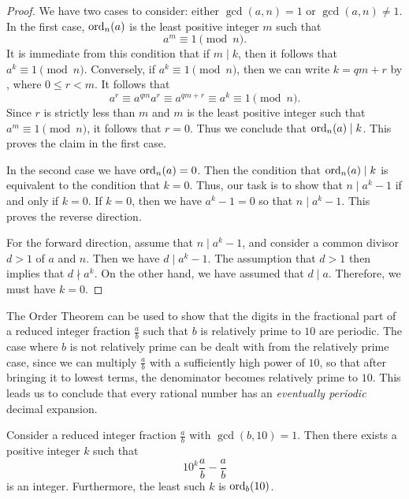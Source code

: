 \begin{proof}
  We have two cases to consider: either $\gcd(a,n)=1$ or $\gcd(a,n)\neq 1$. In the first case, $\operatorname{ord}_n(a)$ is the least positive integer $m$ such that
  \begin{equation*}
    a^m\equiv 1 \pmod{n}.
  \end{equation*}
  It is immediate from this condition that if $m\mid k$, then it follows that $a^k\equiv 1\pmod{n}$. Conversely, if $a^k\equiv 1\pmod{n}$, then we can write $k=qm+r$ by , where $0\leq r<m$. It follows that
  \begin{equation*}
    a^r \equiv a^{qm}a^r \equiv a^{qm+r} \equiv a^k \equiv 1\pmod{n}. 
  \end{equation*}
  Since $r$ is strictly less than $m$ and $m$ is the least positive integer such that $a^m\equiv 1\pmod{n}$, it follows that $r=0$. Thus we conclude that $\operatorname{ord}_n(a)\mid k$. This proves the claim in the first case.

  In the second case we have $\operatorname{ord}_n(a)=0$. Then the condition that $\operatorname{ord}_n(a)\mid k$ is equivalent to the condition that $k=0$. Thus, our task is to show that $n\mid a^k-1$ if and only if $k=0$. If $k=0$, then we have $a^k-1=0$ so that $n\mid a^k-1$. This proves the reverse direction.

  For the forward direction, assume that $n\mid a^k-1$, and consider a common divisor $d>1$ of $a$ and $n$. Then we have $d\mid a^k-1$. The assumption that $d>1$ then implies that $d\nmid a^k$. On the other hand, we have assumed that $d\mid a$. Therefore, we must have $k=0$.
\end{proof}

The Order Theorem can be used to show that the digits in the fractional part of a reduced integer fraction $\frac{a}{b}$ such that $b$ is relatively prime to $10$ are periodic. The case where $b$ is not relatively prime can be dealt with from the relatively prime case, since we can multiply $\frac{a}{b}$ with a sufficiently high power of $10$, so that after bringing it to lowest terms, the denominator becomes relatively prime to $10$. This leads us to conclude that every rational number has an \emph{eventually periodic} decimal expansion.

\begin{theorem}
  Consider a reduced integer fraction $\frac{a}{b}$ with $\gcd(b,10)=1$. Then there exists a positive integer $k$ such that
  \begin{equation*}
    10^k\frac{a}{b}-\frac{a}{b}
  \end{equation*}
  is an integer. Furthermore, the least such $k$ is $\operatorname{ord}_b(10)$.
\end{theorem}

